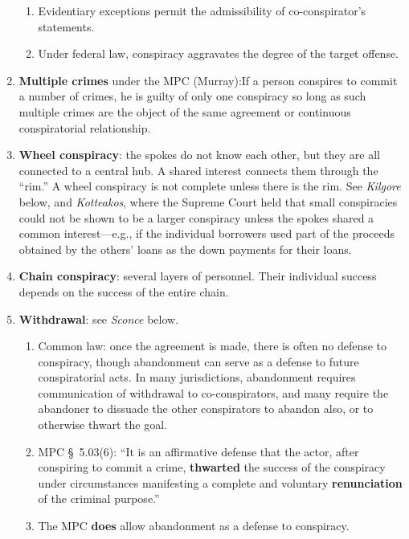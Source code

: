 \begin{enumerate}
\begin{enumerate}
        \item Evidentiary exceptions permit the admissibility of 
        co-conspirator's statements.
        \item Under federal law, conspiracy aggravates the degree of the 
        target offense.
    \end{enumerate}
    \item \textbf{Multiple crimes} under the MPC (Murray):If a person 
    conspires to commit a number of crimes, he is guilty of only one 
    conspiracy so long as such multiple crimes are the object of the same 
    agreement or continuous conspiratorial relationship.
    \item \textbf{Wheel conspiracy}: the spokes do not know each other, but 
    they are all connected to a central hub. A shared interest connects them 
    through the ``rim.'' A wheel conspiracy is not complete unless there is 
    the rim. See \emph{Kilgore} below, and \emph{Kotteakos}, where the Supreme 
    Court held that small conspiracies could not be shown to be a larger 
    conspiracy unless the spokes shared a common interest---e.g., if the 
    individual borrowers used part of the proceeds obtained by the others' 
    loans as the down payments for their loans.
    \item \textbf{Chain conspiracy}: several layers of personnel. Their 
    individual success depends on the success of the entire chain.
    \item \textbf{Withdrawal}: see \emph{Sconce} below.
    \begin{enumerate}
        \item Common law: once the agreement is made, there is often no 
        defense to conspiracy, though abandonment can serve as a defense to 
        future conspiratorial acts. In many jurisdictions, abandonment 
        requires communication of withdrawal to co-conspirators, and many 
        require the abandoner to dissuade the other conspirators to abandon 
        also, or to otherwise thwart the goal.
        \item MPC \S\ 5.03(6): ``It is an affirmative defense that the actor, 
        after conspiring to commit a crime, \textbf{thwarted} the success of 
        the conspiracy under circumstances manifesting a complete and 
        voluntary \textbf{renunciation} of the criminal purpose.''
        \item The MPC \textbf{does} allow abandonment as a defense to 
        conspiracy.
    \end{enumerate}
\end{enumerate}

